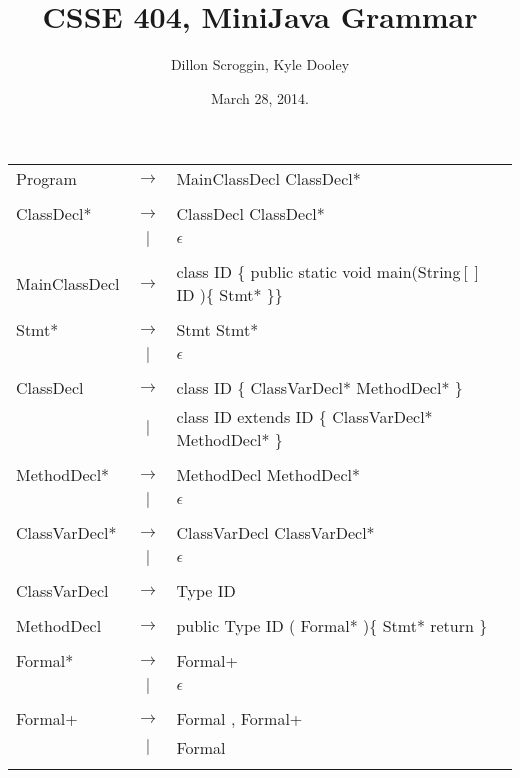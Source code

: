 \documentclass{article}
\author{Dillon Scroggin, Kyle Dooley}
\title{CSSE 404, MiniJava Grammar}
\date{March 28, 2014.}
\begin{document}
\maketitle

\begin{tabular}{ l c l }
	Program & $\rightarrow$ & MainClassDecl ClassDecl* \\
	\\

	ClassDecl* & $\rightarrow$ & ClassDecl ClassDecl* \\
	& $|$ & $\epsilon$\\
	\\

	MainClassDecl & $\rightarrow$ & class ID \{ public static void
main(String$[]$ ID )\{ Stmt* \}\} \\
	\\

	Stmt* & $\rightarrow$ & Stmt Stmt* \\
	&$|$&$\epsilon$ \\
	\\

	ClassDecl & $\rightarrow$ & class ID \{ ClassVarDecl* MethodDecl* \} \\
	& $|$ & class ID extends ID \{ ClassVarDecl* MethodDecl* \} \\
	\\

	MethodDecl* & $\rightarrow$ & MethodDecl MethodDecl* \\
	&$|$&$\epsilon$ \\
	\\
	
	ClassVarDecl* & $\rightarrow$ & ClassVarDecl ClassVarDecl* \\
	&$|$&$\epsilon$ \\
	\\

	ClassVarDecl & $\rightarrow$ & Type ID \\
	\\

	MethodDecl & $\rightarrow$ & public Type ID ( Formal* )\{ Stmt* return \} \\ 
	\\

	Formal* & $\rightarrow$ & Formal+ \\
	& $|$ & $\epsilon$ \\
	\\

	Formal+ & $\rightarrow$ & Formal , Formal+ \\
  	& $|$ & Formal \\
	\\


\end{tabular}
\end{document}
